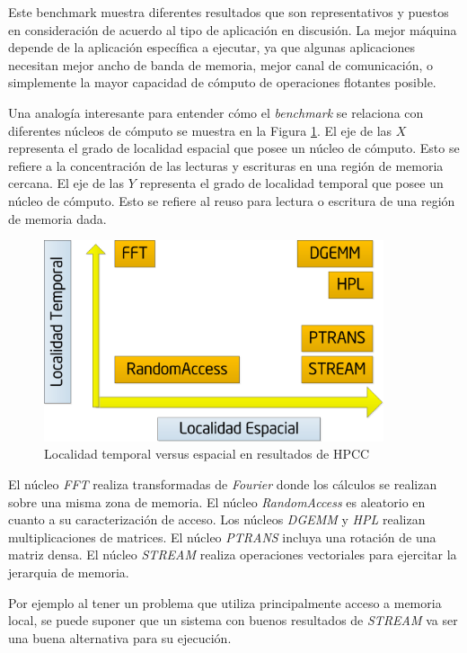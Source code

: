 \documentclass[a4paper]{report}
\begin{document}
\bigskip

Este benchmark muestra diferentes resultados que son representativos y puestos en consideración de acuerdo al tipo de aplicación en discusión.
La mejor máquina depende de la aplicación específica a ejecutar, ya que algunas aplicaciones necesitan mejor ancho de banda de memoria, mejor canal de comunicación, o simplemente la mayor capacidad de cómputo de operaciones flotantes posible.

\bigskip

Una analogía interesante para entender cómo el {\it benchmark} se relaciona con diferentes núcleos de cómputo se muestra en la Figura \ref{fig:locality}. El eje de las $ X $ representa el grado de localidad espacial que posee un núcleo de cómputo. Esto se refiere a la concentración de las lecturas y escrituras en una región de memoria cercana. El eje de las $ Y $ representa el grado de localidad temporal que posee un núcleo de cómputo. Esto se refiere al reuso para lectura o escritura de una región de memoria dada.

\begin{figure}[H]
\begin{center}
\includegraphics[width=10cm]{locality.png}
\caption{Localidad temporal versus espacial en resultados de HPCC}
\label{fig:locality}
\end{center}
\end{figure}

El núcleo {\it FFT} realiza transformadas de {\it Fourier} donde los cálculos se realizan sobre una misma zona de memoria. El núcleo {\it RandomAccess} es aleatorio en cuanto a su caracterización de acceso. Los núcleos {\it DGEMM} y {\it HPL} realizan multiplicaciones de matrices. El núcleo {\it PTRANS} incluya una rotación de una matriz densa. El núcleo {\it STREAM} realiza operaciones vectoriales para ejercitar la jerarquia de memoria.

\bigskip

Por ejemplo al tener un problema que utiliza principalmente acceso a memoria local, se puede suponer que un sistema con buenos resultados de {\it STREAM} va ser una buena alternativa para su ejecución.
\end{document}
